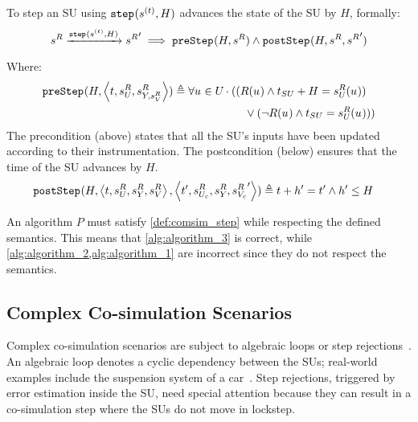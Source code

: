   \begin{definition}\label{def:step}
    To step an SU using $\mathtt{step}_{}(s_{}^{(t)}, H)$ advances the state of the SU by $H$, formally:
    \begin{align*}
      s^{R}_{} 
      \xrightarrow[\text{}]{\mathtt{step}_{}(s_{}^{(t)}, H)} 
      {s^{R}_{}}'
      \implies 
      \mathtt{preStep}_{}(H, s^{R}_{})
      \land
      \mathtt{postStep}_{}(H, s^{R}_{}, {s^{R}_{}}')
    \end{align*}
    Where:
    \begin{align*}
      &\mathtt{preStep}_{}(H,  \left\langle t,s^{R}_{U_{}}, s^{R}_{Y_{}, s^{R}_{V}} \right\rangle ) \triangleq 
      \forall u_{} \in U_{}
      \cdot 
      ((R(u_{}) \land t_{SU} + H = s^{R}_{U_{}}(u_{}))
      \nonumber \\
      &\qquad \qquad \qquad \qquad \qquad \qquad \qquad \qquad \qquad 
      \lor 
      (\neg R(u_{}) \land t_{SU} = s^{R}_{U_{}}(u_{})))
    \end{align*}
    The precondition (above) states that all the SU's inputs have been updated according to their instrumentation.  
    The postcondition (below) ensures that the time of the SU advances by $H$.
    \begin{align*}
      &\mathtt{postStep}_{}(H,  \left\langle t,s^{R}_{U_{}}, s^{R}_{Y_{}}, s^{R}_{V} \right\rangle ,  \left\langle t',s^{R}_{U_{c}}, s^{R}_{Y_{}}, {s^{R}_{V_c}}' \right\rangle ) \triangleq t + h' = t' \land h' \leq H
    \end{align*}
  \end{definition}

An algorithm $P$ must satisfy \cref{def:comsim_step} while respecting the defined semantics.
This means that \cref{alg:algorithm_3} is correct, while \cref{alg:algorithm_2,alg:algorithm_1} are incorrect since they do not respect the semantics.
  
\subsection{Complex Co-simulation Scenarios}
Complex co-simulation scenarios are subject to algebraic loops or step rejections~\cite{thrane2021,Kubler2000,Oakes2021}.
An algebraic loop denotes a cyclic dependency between the SUs; real-world examples include the suspension system of a car~\cite{thranefmi-based2020}.
Step rejections, triggered by error estimation inside the SU, need special attention because they can result in a co-simulation step where the SUs do not move in lockstep.

